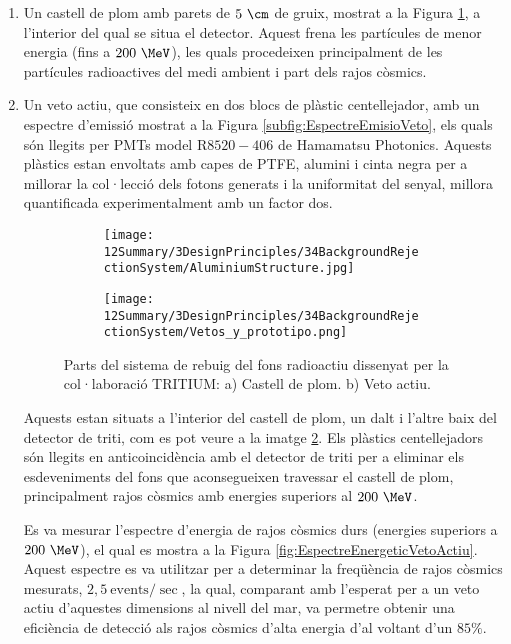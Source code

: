 \begin{enumerate}

\item{} Un castell de plom amb parets de $5~\cm$ de gruix, mostrat a la Figura \ref{subfig:CastellPlom}, a l'interior del qual se situa el detector. Aquest frena les partícules de menor energia (fins a $200~\MeV$), les quals procedeixen principalment de les partícules radioactives del medi ambient i part dels rajos còsmics.

\item{} Un veto actiu, que consisteix en dos blocs de plàstic centellejador, amb un espectre d'emissió mostrat a la Figura \ref{subfig:EspectreEmisioVeto}, els quals són llegits per PMTs model R$8520-406$ de Hamamatsu Photonics. Aquests plàstics estan envoltats amb capes de PTFE, alumini i cinta negra per a millorar la col·lecció dels fotons generats i la uniformitat del senyal, millora quantificada experimentalment amb un factor dos.
\begin{figure}
\centering
    \begin{subfigure}[b]{0.7\textwidth}
    \centering
    \texttt{[image: 12Summary/3DesignPrinciples/34BackgroundRejectionSystem/AluminiumStructure.jpg]}  
        \caption{}\label{subfig:CastellPlom}
    \end{subfigure}
    \hfill
    \begin{subfigure}[b]{0.7\textwidth}
    \centering
    \texttt{[image: 12Summary/3DesignPrinciples/34BackgroundRejectionSystem/Vetos\_y\_prototipo.png]}  
    \caption{\label{subfig:VetoActiu}}
    \end{subfigure}
\caption{Parts del sistema de rebuig del fons radioactiu dissenyat per la col·laboració TRITIUM: a) Castell de plom. b) Veto actiu. \label{fig:SistemaRebuigFonsRadioactiu}}
\end{figure}
Aquests estan situats a l'interior del castell de plom, un dalt i l'altre baix del detector de triti, com es pot veure a la imatge \ref{subfig:VetoActiu}. Els plàstics centellejadors són llegits en anticoincidència amb el detector de triti per a eliminar els esdeveniments del fons que aconsegueixen travessar el castell de plom, principalment rajos còsmics amb energies superiors al $200~\MeV$. 

Es va mesurar l'espectre d'energia de rajos còsmics durs (energies superiors a $200~\MeV$), el qual es mostra a la Figura \ref{fig:EspectreEnergeticVetoActiu}. Aquest espectre es va utilitzar per a determinar la freqüència de rajos còsmics mesurats, $2,5~\text{events}/\sec$, la qual, comparant amb l'esperat per a un veto actiu d'aquestes dimensions al nivell del mar, va permetre obtenir una eficiència de detecció als rajos còsmics d'alta energia d'al voltant d'un $85\%$.


\end{enumerate}
